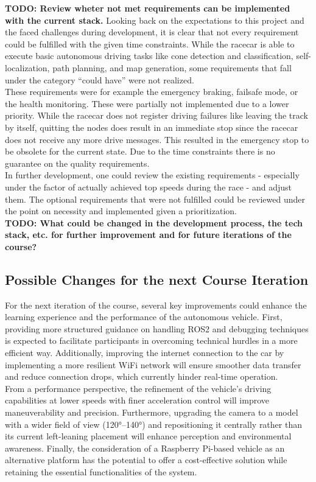 \textbf{TODO: Review wheter not met requirements can be implemented with the current stack.}
Looking back on the expectations to this project and the faced challenges during development, it is clear that not every requirement could be fulfilled with the given time constraints. While the racecar is able to execute basic autonomous driving tasks like cone detection and classification, self-localization, path planning, and map generation, some requirements that fall under the category ``could have'' were not realized.\\
\newline
These requirements were for example the emergency braking, failsafe mode, or the health monitoring. These were partially not implemented due to a lower priority. While the racecar does not register driving failures like leaving the track by itself, quitting the nodes does result in an immediate stop since the racecar does not receive any more drive messages. This resulted in the emergency stop to be obsolete for the current state. Due to the time constraints there is no guarantee on the quality requirements. \\
\newline
In further development, one could review the existing requirements - especially under the factor of actually achieved top speeds during the race - and adjust them. The optional requirements that were not fulfilled could be reviewed under the point on necessity and implemented given a prioritization. \\
\newline
\textbf{TODO: What could be changed in the development process, the tech stack, etc. for further improvement and for future iterations of the course?}
\subsection{Possible Changes for the next Course Iteration}
For the next iteration of the course, several key improvements could enhance the learning experience and the performance of the autonomous vehicle. First, providing more structured guidance on handling ROS2 and debugging techniques is expected to facilitate participants in overcoming technical hurdles in a more efficient way.
Additionally, improving the internet connection to the car by implementing a more resilient WiFi network will ensure smoother data transfer and reduce connection drops, which currently hinder real-time operation.\\
From a performance perspective, the refinement of the vehicle's driving capabilities at lower speeds with finer acceleration control will improve maneuverability and precision. 
Furthermore, upgrading the camera to a model with a wider field of view (120°–140°) and repositioning it centrally rather than its current left-leaning placement will enhance perception and environmental awareness. 
Finally, the consideration of a Raspberry Pi-based vehicle as an alternative platform has the potential to offer a cost-effective solution while retaining the essential functionalities of the system.

